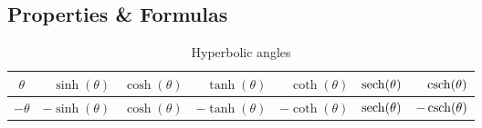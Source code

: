 \subsection{Properties \& Formulas}

\begin{customTableWrapper}{1}
\begin{table}[H]
    \centering
    \begin{tabular}{|c|r|r|r|r|r|r|}
        \hline
        $\theta$ & $\sinh(\theta)$ & $\cosh(\theta)$ & $\tanh(\theta)$ & $\coth(\theta)$ & $\operatorname{sech}(\theta)$ & $\operatorname{csch}(\theta)$ \\ \hline

        $-\theta$ & $-\sinh(\theta)$ & $\cosh(\theta)$ & $-\tanh(\theta)$ & $-\coth(\theta)$ & $\operatorname{sech}(\theta)$ & $-\operatorname{csch}(\theta)$ \\ \hline
    \end{tabular}
    \caption{Hyperbolic angles}
\end{table}
\end{customTableWrapper}


